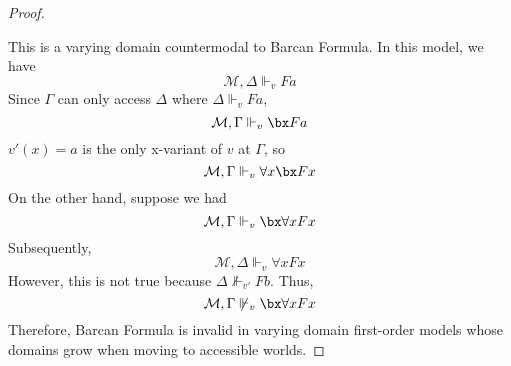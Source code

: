 \begin{enumerate}[label=\alph*)]
\begin{proof}
\begin{center}
\end{center}

This is a varying domain countermodal to Barcan Formula. In this model, we have
\[ \mathcal{M}, \Delta \Vdash_{v} Fa \]
Since $\Gamma$ can only access $\Delta$ where $\Delta \Vdash_{v} Fa$,
\[ \mathcal{M}, \Gamma \Vdash_{v} \bx Fa \]
$v'(x) = a$ is the only x-variant of $v$ at $\Gamma$, so
\[ \mathcal{M}, \Gamma \Vdash_{v} \forall x \bx Fx \]
On the other hand, suppose we had
\[ \mathcal{M}, \Gamma \Vdash_{v} \bx \forall x Fx \]
Subsequently,
\[ \mathcal{M}, \Delta \Vdash_{v} \forall x Fx \]
However, this is not true because $\Delta \not\Vdash_{v'} Fb$. Thus,
\[ \mathcal{M}, \Gamma \not\Vdash_{v} \bx \forall x Fx \]
Therefore, Barcan Formula is invalid in varying domain first-order models whose domains grow when moving to accessible worlds.
\end{proof}
\end{enumerate}